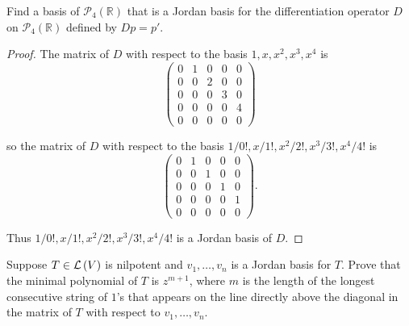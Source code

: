 \begin{exercise}\label{chapter8:sectionC:exercise6}
    Find a basis of $\mathscr{P}_{4}(\mathbb{R})$ that is a Jordan basis for the differentiation operator $D$ on $\mathscr{P}_{4}(\mathbb{R})$ defined by $Dp = p'$.
\end{exercise}

\begin{proof}
    The matrix of $D$ with respect to the basis $1, x, x^{2}, x^{3}, x^{4}$ is
    \[
        \begin{pmatrix}
            0 & 1 & 0 & 0 & 0 \\
            0 & 0 & 2 & 0 & 0 \\
            0 & 0 & 0 & 3 & 0 \\
            0 & 0 & 0 & 0 & 4 \\
            0 & 0 & 0 & 0 & 0
        \end{pmatrix}
    \]

    so the matrix of $D$ with respect to the basis $1/0{!}, x/1{!}, x^{2}/2{!}, x^{3}/3{!}, x^{4}/4{!}$ is
    \[
        \begin{pmatrix}
            0 & 1 & 0 & 0 & 0 \\
            0 & 0 & 1 & 0 & 0 \\
            0 & 0 & 0 & 1 & 0 \\
            0 & 0 & 0 & 0 & 1 \\
            0 & 0 & 0 & 0 & 0
        \end{pmatrix}.
    \]

    Thus $1/0{!}, x/1{!}, x^{2}/2{!}, x^{3}/3{!}, x^{4}/4{!}$ is a Jordan basis of $D$.
\end{proof}
\newpage

\begin{exercise}\label{chapter8:sectionC:exercise7}
    Suppose $T \in \mathcal{L}\left({V}\right)$ is nilpotent and $v_{1}, \ldots, v_{n}$ is a Jordan basis for $T$. Prove that the minimal polynomial of $T$ is $z^{m + 1}$, where $m$ is the length of the longest consecutive string of $1$'s that appears on the line directly above the diagonal in the matrix of $T$ with respect to $v_{1}, \ldots, v_{n}$.
\end{exercise}

